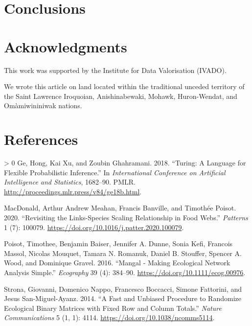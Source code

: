 \documentclass[11pt]{article}
\newlength{\cslhangindent}
\newenvironment{CSLReferences}[3] %
 {%
  \setlength{\parindent}{0pt}
  \ifodd #1 \everypar{\setlength{\hangindent}{\cslhangindent}}\ignorespaces\fi
  \ifnum #2 > 0
  \setlength{\parskip}{#2\baselineskip}
  \fi
 }%
 {}
\begin{document}
\hypertarget{conclusions}{%
\section{Conclusions}\label{conclusions}}

\hypertarget{acknowledgments}{%
\section{Acknowledgments}\label{acknowledgments}}

This work was supported by the Institute for Data Valorisation (IVADO).

We wrote this article on land located within the traditional unceded
territory of the Saint Lawrence Iroquoian, Anishinabewaki, Mohawk,
Huron-Wendat, and Omàmiwininiwak nations.

\hypertarget{references}{%
\section*{References}\label{references}}

\hypertarget{refs}{}
\begin{CSLReferences}{1}{0}
\leavevmode\hypertarget{ref-Ge2018TurLan}{}%
Ge, Hong, Kai Xu, and Zoubin Ghahramani. 2018. {``Turing: A Language for
Flexible Probabilistic Inference.''} In \emph{International Conference
on Artificial Intelligence and Statistics}, 1682--90. PMLR.
\url{http://proceedings.mlr.press/v84/ge18b.html}.

\leavevmode\hypertarget{ref-MacDonald2020RevLina}{}%
MacDonald, Arthur Andrew Meahan, Francis Banville, and Timothée Poisot.
2020. {``Revisiting the Links-Species Scaling Relationship in Food
Webs.''} \emph{Patterns} 1 (7): 100079.
\url{https://doi.org/10.1016/j.patter.2020.100079}.

\leavevmode\hypertarget{ref-Poisot2016ManMak}{}%
Poisot, Timothee, Benjamin Baiser, Jennifer A. Dunne, Sonia Kefi,
Francois Massol, Nicolas Mouquet, Tamara N. Romanuk, Daniel B. Stouffer,
Spencer A. Wood, and Dominique Gravel. 2016. {``Mangal - Making
Ecological Network Analysis Simple.''} \emph{Ecography} 39 (4): 384--90.
\url{https://doi.org/10.1111/ecog.00976}.

\leavevmode\hypertarget{ref-Strona2014FasUnb}{}%
Strona, Giovanni, Domenico Nappo, Francesco Boccacci, Simone Fattorini,
and Jesus San-Miguel-Ayanz. 2014. {``A Fast and Unbiased Procedure to
Randomize Ecological Binary Matrices with Fixed Row and Column
Totals.''} \emph{Nature Communications} 5 (1, 1): 4114.
\url{https://doi.org/10.1038/ncomms5114}.

\end{CSLReferences}
\end{document}
